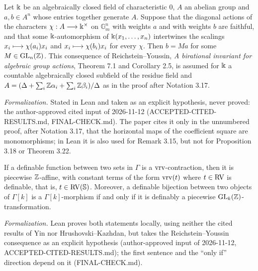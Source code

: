\begin{assumption}
\label{hyp-reichstein-youssin}
\leanok
Let $\Bbbk$ be an algebraically closed field of characteristic $0$, $A$ an abelian group and $a, b \in A^n$ whose entries together generate $A$. Suppose that the diagonal actions of the characters $\chi : A \longrightarrow \Bbbk^\times$ on $\mathbb{G}_m^n$ with weights $a$ and with weights $b$ are faithful, and that some $\Bbbk$-automorphism of $\Bbbk(x_1, \ldots, x_n)$ intertwines the scalings $x_i \longmapsto \chi(a_i) x_i$ and $x_i \longmapsto \chi(b_i) x_i$ for every $\chi$. Then $b = M a$ for some $M \in \operatorname{GL}_n(\mathbb{Z})$. This consequence of Reichstein--Youssin, \emph{A birational invariant for algebraic group actions}, Theorem 7.1 and Corollary 2.5, is assumed for $\Bbbk$ a countable algebraically closed subfield of the residue field and $A = (\Delta + \sum_i \mathbb{Z} \alpha_i + \sum_i \mathbb{Z} \beta_i)/\Delta$ as in the proof after Notation 3.17.

\emph{Formalization.} Stated in Lean and taken as an explicit hypothesis, never proved: the author-approved cited input of 2026-11-12 (ACCEPTED-CITED-RESULTS.md, FINAL-CHECK.md). The paper cites it only in the unnumbered proof, after Notation 3.17, that the horizontal maps of the coefficient square are monomorphisms; in Lean it is also used for Remark 3.15, but not for Proposition 3.18 or Theorem 3.22.
\end{assumption}

\setcounter{theorem}{14}
\begin{remark}
\label{GLZ-char}
\leanok
{}
If a definable function between two sets in $\Gamma$ is a $\operatorname{vrv}$-contraction, then it is piecewise $\mathbb{Z}$-affine, with constant terms of the form $\operatorname{vrv}(t)$ where $t \in \mathrm{RV}$ is definable, that is, $t \in \mathrm{RV}(\mathbb{S})$. Moreover, a definable bijection between two objects of $\Gamma[k]$ is a $\Gamma[k]$-morphism if and only if it is definably a piecewise $\operatorname{GL}_k(\mathbb{Z})$-transformation.

\emph{Formalization.} Lean proves both statements locally, using neither the cited results of Yin nor Hrushovski--Kazhdan, but takes the Reichstein--Youssin consequence as an explicit hypothesis (author-approved input of 2026-11-12, ACCEPTED-CITED-RESULTS.md); the first sentence and the ``only if'' direction depend on it (FINAL-CHECK.md).
\end{remark}

